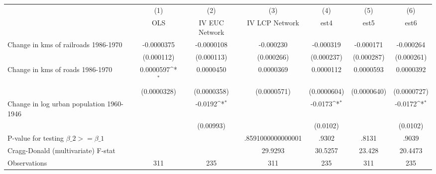 {
\def\sym#1{\ifmmode^{#1}\else\(^{#1}\)\fi}
\begin{tabular}{l*{6}{c}}
\hline\hline
                &\multicolumn{1}{c}{(1)}&\multicolumn{1}{c}{(2)}&\multicolumn{1}{c}{(3)}&\multicolumn{1}{c}{(4)}&\multicolumn{1}{c}{(5)}&\multicolumn{1}{c}{(6)}\\
                &\multicolumn{1}{c}{OLS}&\multicolumn{1}{c}{IV EUC Network}&\multicolumn{1}{c}{IV LCP Network}&\multicolumn{1}{c}{est4}&\multicolumn{1}{c}{est5}&\multicolumn{1}{c}{est6}\\
\hline
Change in kms of railroads 1986-1970&-0.0000375         &-0.0000108         &-0.000230         &-0.000319         &-0.000171         &-0.000264         \\
                &(0.000112)         &(0.000113)         &(0.000266)         &(0.000237)         &(0.000287)         &(0.000261)         \\
[1em]
Change in kms of roads 1986-1970&0.0000597\sym{*}  &0.0000450         &0.0000369         &0.0000112         &0.0000593         &0.0000392         \\
                &(0.0000328)         &(0.0000358)         &(0.0000571)         &(0.0000604)         &(0.0000640)         &(0.0000727)         \\
[1em]
Change in log urban population 1960-1946&                  &  -0.0192\sym{*}  &                  &  -0.0173\sym{*}  &                  &  -0.0172\sym{*}  \\
                &                  &(0.00993)         &                  & (0.0102)         &                  & (0.0102)         \\
\hline
P-value for testing $\beta\_{2} >= \beta\_{1}$&                  &                  &.8591000000000001         &    .9302         &    .8131         &    .9039         \\
Cragg-Donald (multivariate) F-stat&                  &                  &  29.9293         &  30.5257         &   23.428         &  20.4473         \\
Observations    &      311         &      235         &      311         &      235         &      311         &      235         \\
\hline\hline
\end{tabular}
}
